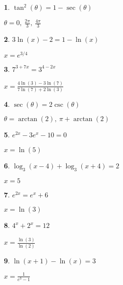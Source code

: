\documentclass{amsbook}
\newtheorem{exc}{}
\newenvironment{ex}{\begin{exc}\normalfont}{\end{exc}}
\numberwithin{section}{chapter}
\numberwithin{equation}{chapter}
\begin{document}
\begin{multicols}{2}
\begin{ex}
	$\tan^2(\theta) = 1-\sec(\theta)$
	\begin{sol}
		$\theta = 0,\  \frac{2\pi}{3},\ \frac{4\pi}{3}$
	\end{sol}
\end{ex}

\begin{ex}
	$3\ln(x)-2=1-\ln(x)$
	\begin{sol}
		$x=e^{3/4}$
	\end{sol}
\end{ex}

\begin{ex}
	$7^{3+7x} = 3^{4-2x}$ 
	\begin{sol}
		$x = \frac{4 \ln(3) - 3 \ln(7)}{7 \ln(7) + 2 \ln(3)}$
	\end{sol}
\end{ex}


\begin{ex}
	$\sec(\theta) = 2\csc(\theta)$
	\begin{sol}
		$\theta = \arctan(2),\ \pi+\arctan(2)$
	\end{sol}
\end{ex}

\begin{ex}
	$e^{2x} - 3e^{x}-10=0$ 
	\begin{sol}
		$x=\ln(5)$
	\end{sol}
\end{ex}


\begin{ex}
	$\log_{3}(x - 4) + \log_{3}(x + 4) = 2$
	\begin{sol}
		 $x = 5$
	\end{sol}
\end{ex}

\begin{ex}
	$e^{2x} = e^{x}+6$ %
	\begin{sol}
		$x=\ln(3)$
	\end{sol}
\end{ex}

\begin{ex}
	$4^{x} + 2^{x} = 12$ %
	\begin{sol}
		$x=\frac{\ln(3)}{\ln(2)}$
	\end{sol}
\end{ex}



\begin{ex}
	 $\ln(x+1) - \ln(x) = 3$ 
	\begin{sol}
		$x = \frac{1}{e^3-1}$
	\end{sol}
\end{ex}


\end{multicols}
\end{document}
